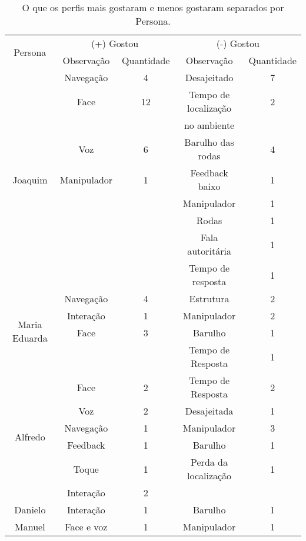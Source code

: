 \begin{table}[!ht]
	\caption{O que os perfis mais gostaram e menos gostaram separados por Persona.}
	\label{tab:agradou}
	\centering
	\begin{tabular}{c | c | c | c | c}
        \hline
        \multirow{2}{*}{Persona} & \multicolumn{2}{c}{(+) Gostou} & \multicolumn{2}{c}{(-) Gostou} \\
        \hhline{~----}
		& Observação & Quantidade & Observação & Quantidade \\
		\hline
        \multirow{9}{*}{Joaquim} & Navegação & 4 & Desajeitado & 7 \\
        \hhline{~----}
		& Face & 12 & Tempo de localização & 2 \\
        & & & no ambiente &  \\
        \hhline{~----}
        & Voz & 6 & Barulho das rodas & 4 \\
        \hhline{~----}
        & Manipulador & 1 & Feedback baixo & 1 \\
        \hhline{~----}
        & & & Manipulador & 1 \\
        \hhline{~----}
		& & & Rodas & 1 \\
        \hhline{~----}
		& & & Fala autoritária & 1 \\
        \hhline{~----}
		& & & Tempo de resposta & 1 \\
        \hline
        \multirow{4}{*}{Maria Eduarda} & Navegação & 4 & Estrutura & 2 \\
        \hhline{~----}
        & Interação & 1 & Manipulador & 2 \\
        \hhline{~----}
        & Face & 3 & Barulho & 1 \\
		\hhline{~----}
        & & & Tempo de Resposta & 1 \\
        \hline
        \multirow{6}{*}{Alfredo} & Face & 2 & Tempo de Resposta & 2 \\
        \hhline{~----}
        & Voz & 2 & Desajeitada & 1 \\
        \hhline{~----}
        & Navegação & 1 & Manipulador & 3 \\
		\hhline{~----}
        & Feedback & 1 & Barulho & 1 \\
		\hhline{~----}
        & Toque & 1 & Perda da localização & 1 \\
		\hhline{~----}
        & Interação & 2 & & \\
        \hline
        Danielo & Interação & 1 & Barulho & 1 \\
        \hline
        Manuel & Face e voz & 1 & Manipulador & 1 \\
        \hline
    \end{tabular}
\end{table}

